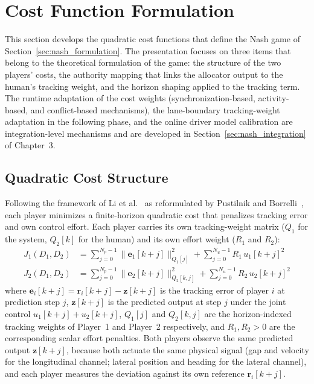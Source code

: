\documentclass[12pt,a4paper,oneside]{report}
\begin{document}
\section{Cost Function Formulation}
\label{sec:cost_functions}
This section develops the quadratic cost functions that define the Nash game of Section~\ref{sec:nash_formulation}. The presentation focuses on three items that belong to the theoretical formulation of the game: the structure of the two players' costs, the authority mapping that links the allocator output to the human's tracking weight, and the horizon shaping applied to the tracking term. The runtime adaptation of the cost weights (synchronization-based, activity-based, and conflict-based mechanisms), the lane-boundary tracking-weight adaptation in the following phase, and the online driver model calibration are integration-level mechanisms and are developed in Section~\ref{sec:nash_integration} of Chapter~3.

\subsection{Quadratic Cost Structure}
\label{sec:cost_quadratic}

Following the framework of Li et al.~\cite{liSharedControlNovel2019} as reformulated by Pustilnik and Borrelli~\cite{pustilnikGeneralizedNashEquilibrium2025}, each player minimizes a finite-horizon quadratic cost that penalizes tracking error and own control effort. Each player carries its own tracking-weight matrix ($Q_1$ for the system, $Q_2[k]$ for the human) and its own effort weight ($R_1$ and $R_2$):
\begin{align}
J_1(D_1, D_2) &= \sum_{j=0}^{N_p-1} \| \mathbf{e}_1[k+j] \|_{Q_1[j]}^{2} + \sum_{j=0}^{N_u-1} R_1 \, u_1[k+j]^2 \label{eq:cost_player1}\\
J_2(D_1, D_2) &= \sum_{j=0}^{N_p-1} \| \mathbf{e}_2[k+j] \|_{Q_2[k, j]}^{2} + \sum_{j=0}^{N_u-1} R_2 \, u_2[k+j]^2 \label{eq:cost_player2}
\end{align}
where $\mathbf{e}_i[k+j] = \mathbf{r}_i[k+j] - \mathbf{z}[k+j]$ is the tracking error of player $i$ at prediction step $j$, $\mathbf{z}[k+j]$ is the predicted output at step $j$ under the joint control $u_1[k+j] + u_2[k+j]$, $Q_1[j]$ and $Q_2[k, j]$ are the horizon-indexed tracking weights of Player~1 and Player~2 respectively, and $R_1, R_2 > 0$ are the corresponding scalar effort penalties. Both players observe the same predicted output $\mathbf{z}[k+j]$, because both actuate the same physical signal (gap and velocity for the longitudinal channel; lateral position and heading for the lateral channel), and each player measures the deviation against its own reference $\mathbf{r}_i[k+j]$.
\end{document}
